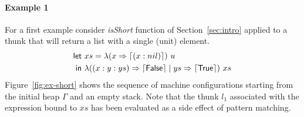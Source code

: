 \paragraph{Example 1}
For a first example consider \textit{isShort} function of
Section~\ref{sec:intro} applied to a thunk that will return a list
with a single (unit) element.
\begin{equation}
  \begin{split}
  \textsf{let}~&xs = \lambda(x \Rightarrow \left\lceil (x : nil)\right\rceil)~u \\
  \textsf{in}~&\lambda((x : y : ys) \Rightarrow \left\lceil \textsf{False}\right\rceil \mid ys \Rightarrow \left\lceil \textsf{True}\right\rceil)~xs
  \end{split} \label{eq:example1}
\end{equation}
Figure~\ref{fig:ex-short} shows the sequence of machine configurations
starting from the initial heap $\Gamma$ and an empty stack.  Note that
the thunk $l_1$ associated with the expression bound to $xs$ 
has been evaluated as a side effect of pattern matching.

